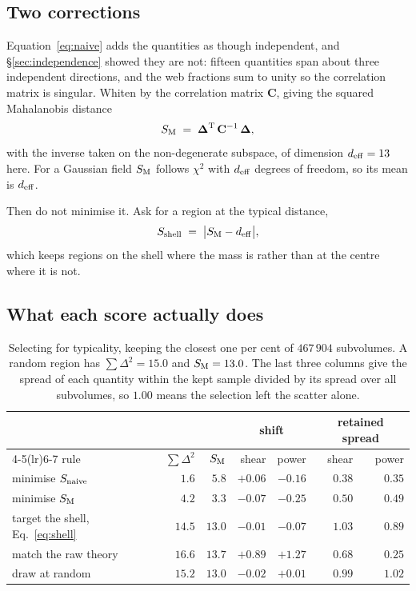 \documentclass[12pt]{article}
\begin{document}
\subsection{Two corrections}
\label{sec:mahalanobis}

Equation~\eqref{eq:naive} adds the quantities as though independent, and
\S\ref{sec:independence} showed they are not: fifteen quantities span about
three independent directions, and the web fractions sum to unity so the
correlation matrix is singular. Whiten by the correlation matrix $\mathbf{C}$,
giving the squared Mahalanobis distance
\begin{equation}
  \label{eq:mahal}
  S_{\rm M} \;=\; \boldsymbol\Delta^{\rm T}\, \mathbf{C}^{-1}\,
                  \boldsymbol\Delta ,
\end{equation}
with the inverse taken on the non-degenerate subspace, of dimension
$d_{\rm eff} = 13$ here. For a Gaussian field $S_{\rm M}$ follows $\chi^2$ with
$d_{\rm eff}$ degrees of freedom, so its mean is $d_{\rm eff}$.

Then do not minimise it. Ask for a region at the typical distance,
\begin{equation}
  \label{eq:shell}
  S_{\rm shell} \;=\; \big| S_{\rm M} - d_{\rm eff} \big| ,
\end{equation}
which keeps regions on the shell where the mass is rather than at the centre
where it is not.

\subsection{What each score actually does}
\label{sec:scores-measured}

\begin{table}[htbp]
  \centering
  \caption{Selecting for typicality, keeping the closest one per cent of
  $467\,904$ subvolumes. A random region has $\sum\Delta^2 = 15.0$ and
  $S_{\rm M} = 13.0$. The last three columns give the spread of each quantity
  within the kept sample divided by its spread over all subvolumes, so $1.00$
  means the selection left the scatter alone.}
  \label{tab:typicality}
  \begin{tabular}{lrrrrrr}
    \toprule
    & & & \multicolumn{2}{c}{shift} & \multicolumn{2}{c}{retained spread} \\
    \cmidrule(lr){4-5}\cmidrule(lr){6-7}
    rule & $\sum\Delta^2$ & $S_{\rm M}$ & shear & power & shear & power \\
    \midrule
    minimise $S_{\rm naive}$   & $1.6$  & $5.8$  & $+0.06$ & $-0.16$ & $0.38$ & $0.35$ \\
    minimise $S_{\rm M}$       & $4.2$  & $3.3$  & $-0.07$ & $-0.25$ & $0.50$ & $0.49$ \\
    target the shell, Eq.~\eqref{eq:shell} & $14.5$ & $13.0$ & $-0.01$ & $-0.07$ & $1.03$ & $0.89$ \\
    match the raw theory       & $16.6$ & $13.7$ & $+0.89$ & $+1.27$ & $0.68$ & $0.25$ \\
    draw at random             & $15.2$ & $13.0$ & $-0.02$ & $+0.01$ & $0.99$ & $1.02$ \\
    \bottomrule
  \end{tabular}
\end{table}
\end{document}
